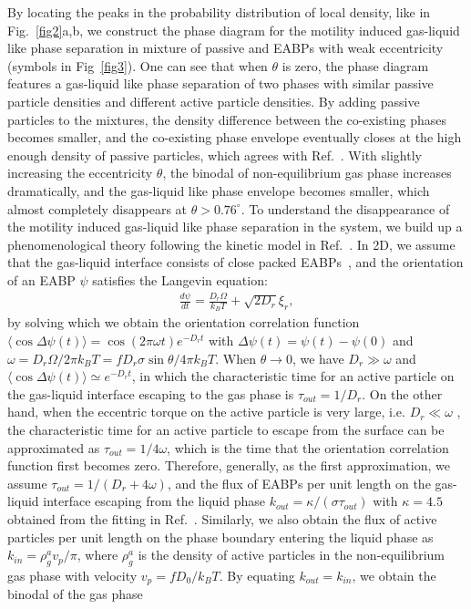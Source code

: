 \documentclass[prl, twocolumn, showpacs, preprintnumbers,amsmath,amssymb]{revtex4-1}
\begin{document}
By locating the peaks in the probability distribution of local density, like in Fig.~\ref{fig2}a,b, we construct the phase diagram for the motility induced gas-liquid like phase separation in mixture of passive and EABPs with weak eccentricity (symbols in Fig~\ref{fig3}). One can see that when $\theta$ is zero, the phase diagram features a gas-liquid like phase separation of two phases with similar passive particle densities and different active particle densities. By adding passive particles to the mixtures, the density difference between the co-existing phases becomes smaller, and the co-existing phase envelope eventually closes at the high enough density of passive particles, which agrees with Ref.~\cite{stenhammar2015a}. With slightly increasing the eccentricity $\theta$, the binodal of non-equilibrium gas phase increases dramatically, and the gas-liquid like phase envelope becomes smaller, which almost completely disappears at $\theta > 0.76^{\circ}$. To understand the disappearance of the motility induced gas-liquid like phase separation in the system, we build up a phenomenological theory following the kinetic model in Ref.~\cite{redner2013,stenhammar2015a}. In 2D, we assume that the gas-liquid interface consists of close packed EABPs~\cite{stenhammar2015a}, and the orientation of an EABP $\psi$ satisfies the Langevin equation:
\begin{eqnarray}\label{eqbd}
\frac{d\psi}{d t}=\frac{D_r \Omega}{k_B T} +\sqrt{2D_r}\xi_r,
\end{eqnarray}
by solving which we obtain the orientation correlation function $\langle \cos \Delta \psi(t) \rangle =\cos(2\pi \omega t)e^{-D_rt}$ with $\Delta \psi(t)= \psi(t)-\psi(0)$ and $\omega=D_r\Omega/2 \pi k_BT= f D_r  \sigma \sin\theta /4\pi k_BT$. When $\theta \rightarrow 0$, we have $D_r \gg \omega$ and $\langle \cos\Delta \psi(t) \rangle \simeq e^{-D_rt}$, in which the characteristic time for an active particle on the gas-liquid interface escaping to the gas phase is $\tau_{out} = 1/D_r$. On the other hand, when the eccentric torque on the active particle is very large, i.e. $D_r \ll \omega$  , the characteristic time for an active particle to escape from the surface can be approximated as $\tau_{out}=1/4\omega$, which is the time that the orientation correlation function first becomes zero. Therefore, generally, as the first approximation, we assume $\tau_{out} = 1/(D_r + 4 \omega)$, and the flux of EABPs per unit length on the gas-liquid interface escaping from the liquid phase $k_{out} = \kappa /( \sigma \tau_{out})$ with $\kappa = 4.5$ obtained from the fitting in Ref.~\cite{redner2013}. Similarly, we also obtain the flux of active particles per unit length on the phase boundary entering the liquid phase as $k_{in} = \rho_{g}^{a} v_p/\pi$, where $\rho_{g}^{a}$ is the density of active particles in the non-equilibrium gas phase with velocity $v_p = f D_0/k_BT$. By equating $k_{out} = k_{in}$, we  obtain the binodal of the gas phase 
\end{document}
